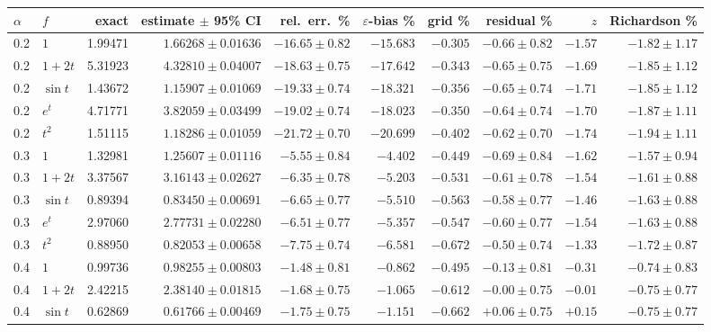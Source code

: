 \documentclass[11pt]{article}
\theoremstyle{remark}
\theoremstyle{definition}
\begin{document}
\begin{table}[t]
\centering\scriptsize
\setlength{\tabcolsep}{2.6pt}
\begin{tabular}{@{}llrrrrrrrr@{}}
\toprule
$\alpha$ & $f$ & exact & estimate $\pm$ 95\% CI & rel.\ err.\ \% & $\varepsilon$-bias \% & grid \% & residual \% & $z$ & Richardson \% \\
\midrule
0.2 & $1$ & 1.99471 & $1.66268\pm0.01636$ & $-16.65\pm0.82$ & $-15.683$ & $-0.305$ & $-0.66\pm0.82$ & $-1.57$ & $-1.82\pm1.17$\\
0.2 & $1+2t$ & 5.31923 & $4.32810\pm0.04007$ & $-18.63\pm0.75$ & $-17.642$ & $-0.343$ & $-0.65\pm0.75$ & $-1.69$ & $-1.85\pm1.12$\\
0.2 & $\sin t$ & 1.43672 & $1.15907\pm0.01069$ & $-19.33\pm0.74$ & $-18.321$ & $-0.356$ & $-0.65\pm0.74$ & $-1.71$ & $-1.85\pm1.12$\\
0.2 & $e^t$ & 4.71771 & $3.82059\pm0.03499$ & $-19.02\pm0.74$ & $-18.023$ & $-0.350$ & $-0.64\pm0.74$ & $-1.70$ & $-1.87\pm1.11$\\
0.2 & $t^2$ & 1.51115 & $1.18286\pm0.01059$ & $-21.72\pm0.70$ & $-20.699$ & $-0.402$ & $-0.62\pm0.70$ & $-1.74$ & $-1.94\pm1.11$\\
\midrule
0.3 & $1$ & 1.32981 & $1.25607\pm0.01116$ & $-5.55\pm0.84$ & $-4.402$ & $-0.449$ & $-0.69\pm0.84$ & $-1.62$ & $-1.57\pm0.94$\\
0.3 & $1+2t$ & 3.37567 & $3.16143\pm0.02627$ & $-6.35\pm0.78$ & $-5.203$ & $-0.531$ & $-0.61\pm0.78$ & $-1.54$ & $-1.61\pm0.88$\\
0.3 & $\sin t$ & 0.89394 & $0.83450\pm0.00691$ & $-6.65\pm0.77$ & $-5.510$ & $-0.563$ & $-0.58\pm0.77$ & $-1.46$ & $-1.63\pm0.88$\\
0.3 & $e^t$ & 2.97060 & $2.77731\pm0.02280$ & $-6.51\pm0.77$ & $-5.357$ & $-0.547$ & $-0.60\pm0.77$ & $-1.54$ & $-1.63\pm0.88$\\
0.3 & $t^2$ & 0.88950 & $0.82053\pm0.00658$ & $-7.75\pm0.74$ & $-6.581$ & $-0.672$ & $-0.50\pm0.74$ & $-1.33$ & $-1.72\pm0.87$\\
\midrule
0.4 & $1$ & 0.99736 & $0.98255\pm0.00803$ & $-1.48\pm0.81$ & $-0.862$ & $-0.495$ & $-0.13\pm0.81$ & $-0.31$ & $-0.74\pm0.83$\\
0.4 & $1+2t$ & 2.42215 & $2.38140\pm0.01815$ & $-1.68\pm0.75$ & $-1.065$ & $-0.612$ & $-0.00\pm0.75$ & $-0.01$ & $-0.75\pm0.77$\\
0.4 & $\sin t$ & 0.62869 & $0.61766\pm0.00469$ & $-1.75\pm0.75$ & $-1.151$ & $-0.662$ & $+0.06\pm0.75$ & $+0.15$ & $-0.75\pm0.77$\\

\end{tabular}
\end{table}
\end{document}
